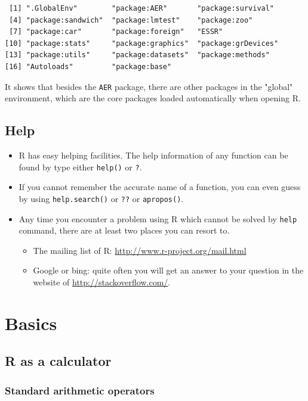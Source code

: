 \documentclass[a4paper,11pt]{article}
\begin{document}
\begin{verbatim}
 [1] ".GlobalEnv"        "package:AER"       "package:survival"
 [4] "package:sandwich"  "package:lmtest"    "package:zoo"
 [7] "package:car"       "package:foreign"   "ESSR"
[10] "package:stats"     "package:graphics"  "package:grDevices"
[13] "package:utils"     "package:datasets"  "package:methods"
[16] "Autoloads"         "package:base"
\end{verbatim}

It shows that besides the \texttt{AER} package, there are other packages
in the "global" environment, which are the core packages loaded
automatically when opening R.


\subsection{Help}
\label{sec:org58bb39c}

\begin{itemize}
\item R has easy helping facilities. The help information of any function
can be found by type either \texttt{help()} or \texttt{?}.
\item If you cannot remember the accurate name of a function, you can even
guess by using \texttt{help.search()} or \texttt{??} or \texttt{apropos()}.
\item Any time you encounter a problem using R which cannot be solved by
\texttt{help} command, there are at least two places you can resort to.
\begin{itemize}
\item The mailing list of R: \url{http://www.r-project.org/mail.html}
\item Google or bing: quite often you will get an answer to your
question in the website of \url{http://stackoverflow.com/}.
\end{itemize}
\end{itemize}


\section{Basics}
\label{sec:org803fac9}

\subsection{R as a calculator}
\label{sec:org8da9543}

\subsubsection*{Standard arithmetic operators}
\label{sec:org0402dbf}
\end{document}
